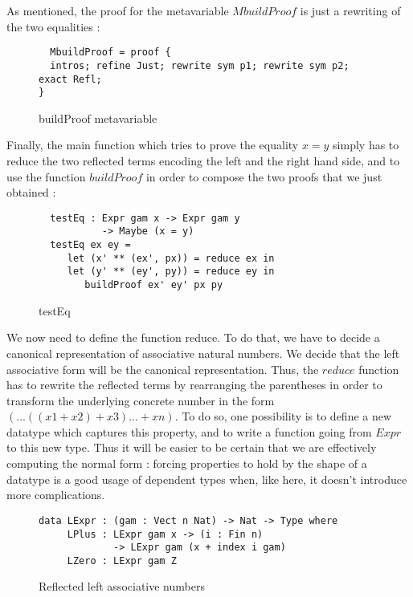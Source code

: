 As mentioned, the proof for the metavariable $MbuildProof$ is just a rewriting of the two equalities :

\begin{figure}[H]
\figrule
\begin{center}
\begin{verbatim}
  MbuildProof = proof {
  intros; refine Just; rewrite sym p1; rewrite sym p2; exact Refl;
}  
\end{verbatim}
\end{center}
\caption{buildProof metavariable}
\figrule
\end{figure}

Finally, the main function which tries to prove the equality $x=y$ simply has to reduce the two reflected terms encoding the left and the right hand side, and to use the function $buildProof$ in order to compose the two proofs that we just obtained :

\begin{figure}[H]
\figrule
\begin{center}
\begin{verbatim}
  testEq : Expr gam x -> Expr gam y 
           -> Maybe (x = y)
  testEq ex ey = 
     let (x' ** (ex', px)) = reduce ex in 
     let (y' ** (ey', py)) = reduce ey in
        buildProof ex' ey' px py 
\end{verbatim}
\end{center}
\caption{testEq}
\figrule
\end{figure}

We now need to define the function reduce. To do that, we have to decide a canonical representation of associative natural numbers. We decide that the left associative form will be the canonical representation. Thus, the $reduce$ function has to rewrite the reflected terms by rearranging the parentheses in order to transform the underlying concrete number in the form $(...((x1 + x2) + x3) ... + xn)$. To do so, one possibility is to define a new datatype which captures this property, and to write a function going from $Expr$ to this new type. Thus it will be easier to be certain that we are effectively computing the normal form : forcing properties to hold by the shape of a datatype is a good usage of dependent types when, like here, it doesn't introduce more complications.

\begin{figure}[H]
\figrule
\begin{center}
\begin{verbatim}
data LExpr : (gam : Vect n Nat) -> Nat -> Type where
     LPlus : LExpr gam x -> (i : Fin n) 
             -> LExpr gam (x + index i gam)
     LZero : LExpr gam Z
\end{verbatim}
\end{center}
\caption{Reflected left associative numbers}
\figrule
\end{figure}

